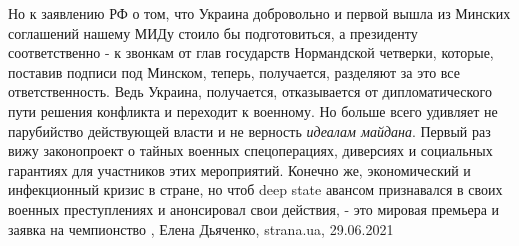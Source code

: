 Но к заявлению РФ о том, что Украина добровольно и первой вышла из Минских
соглашений нашему МИДу стоило бы подготовиться, а президенту соответственно - к
звонкам от глав государств Нормандской четверки, которые, поставив подписи под
Минском, теперь, получается, разделяют за это все ответственность. Ведь
Украина, получается, отказывается от дипломатического пути решения конфликта и
переходит к военному. Но больше всего удивляет не парубийство действующей
власти и не верность \emph{идеалам майдана}. Первый раз вижу законопроект о тайных
военных спецоперациях, диверсиях и социальных гарантиях для участников этих
мероприятий. Конечно же, экономический и инфекционный кризис в стране, но чтоб
deep state авансом признавался в своих военных преступлениях и анонсировал свои
действия, - это мировая премьера и заявка на чемпионство
, 
Елена Дьяченко, strana.ua, 29.06.2021

